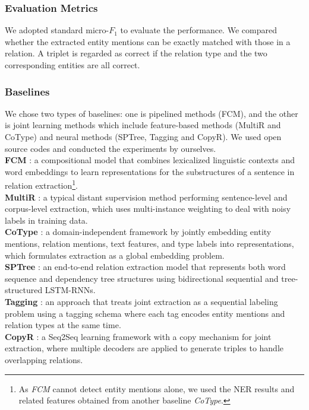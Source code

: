 \documentclass[letterpaper]{article} %
\theoremstyle{definition}
\begin{document}
\subsubsection{Evaluation Metrics}
We adopted standard micro-$F_1$ to evaluate the performance. We compared whether the extracted entity mentions can be exactly matched with those in a relation.
A triplet is regarded as correct if the relation type and the two corresponding entities are all correct.

\subsubsection{Baselines}
We chose two types of baselines: one is pipelined methods (FCM), and the other is joint learning methods which include feature-based methods (MultiR and CoType) and neural methods (SPTree, Tagging and CopyR). We used open source codes and conducted the experiments by ourselves.
\\
\textbf{FCM} \cite{gormley2015improved}: a compositional model that combines lexicalized linguistic contexts and word embeddings to learn representations for the substructures of a sentence in relation extraction\footnote{As \textit{FCM} cannot detect entity mentions alone, we used the NER results and related features obtained from another baseline \textit{CoType}.}.
\\
\textbf{MultiR} \cite{hoffmann2011knowledge}: a typical distant supervision method performing sentence-level and corpus-level extraction, which uses multi-instance weighting to deal with noisy labels in training data.
\\
\textbf{CoType} \cite{ren2017cotype}: a domain-independent framework by jointly embedding entity mentions, relation mentions, text features, and type labels into representations, which formulates extraction as a global embedding problem.
\\
\textbf{SPTree} \cite{miwa2016end}: an end-to-end relation extraction model that represents both word sequence and dependency tree structures using bidirectional sequential and tree-structured LSTM-RNNs.
\\
\textbf{Tagging} \cite{zheng2017joint}: an approach that treats joint extraction as a sequential labeling problem using a tagging schema where each tag encodes entity mentions and relation types at the same time.
\\
\textbf{CopyR} \cite{zeng2018extracting}: a Seq2Seq learning framework with a copy mechanism for joint extraction, where multiple decoders are applied to generate triples to handle overlapping relations.
\end{document}
